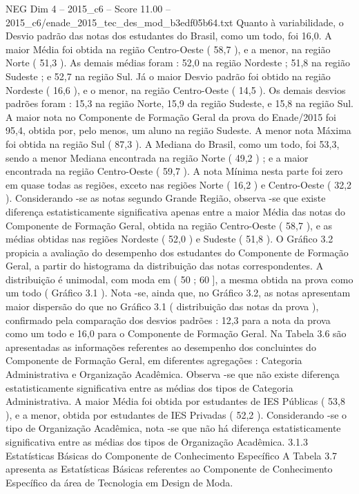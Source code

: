\begin{textsample}{NEG Dim 4 – 2015\_c6 – Score 11.00 – 2015\_c6/enade\_2015\_tec\_des\_mod\_b3edf05b64.txt}
Quanto à variabilidade, o Desvio padrão das notas dos estudantes do Brasil, como um todo, foi 16,0.
A maior Média foi obtida na região Centro-Oeste ( 58,7 ), e a menor, na região Norte ( 51,3 ).
As demais médias foram : 52,0 na região Nordeste ; 51,8 na região Sudeste ; e 52,7 na região Sul.
Já o maior Desvio padrão foi obtido na região Nordeste ( 16,6 ), e o menor, na região Centro-Oeste ( 14,5 ).
Os demais desvios padrões foram : 15,3 na região Norte, 15,9 da região Sudeste, e 15,8 na região Sul.
A maior nota no Componente de Formação Geral da prova do Enade/2015 foi 95,4, obtida por, pelo menos, um aluno na região Sudeste.
A menor nota Máxima foi obtida na região Sul ( 87,3 ).
A Mediana do Brasil, como um todo, foi 53,3, sendo a menor Mediana encontrada na região Norte ( 49,2 ) ; e a maior encontrada na região Centro-Oeste ( 59,7 ).
A nota Mínima nesta parte foi zero em quase todas as regiões, exceto nas regiões Norte ( 16,2 ) e Centro-Oeste ( 32,2 ).
Considerando -se as notas segundo Grande Região, observa -se que existe diferença estatisticamente significativa apenas entre a maior Média das notas do Componente de Formação Geral, obtida na região Centro-Oeste ( 58,7 ), e as médias obtidas nas regiões Nordeste ( 52,0 ) e Sudeste ( 51,8 ).
O Gráfico 3.2 propicia a avaliação do desempenho dos estudantes do Componente de Formação Geral, a partir do histograma da distribuição das notas correspondentes.
A distribuição é unimodal, com moda em ( 50 ; 60 ], a mesma obtida na prova como um todo ( Gráfico 3.1 ).
Nota -se, ainda que, no Gráfico 3.2, as notas apresentam maior dispersão do que no Gráfico 3.1 ( distribuição das notas da prova ), confirmado pela comparação dos desvios padrões : 12,3 para a nota da prova como um todo e 16,0 para o Componente de Formação Geral.
Na Tabela 3.6 são apresentadas as informações referentes ao desempenho dos concluintes do Componente de Formação Geral, em diferentes agregações : Categoria Administrativa e Organização Acadêmica.
Observa -se que não existe diferença estatisticamente significativa entre as médias dos tipos de Categoria Administrativa.
A maior Média foi obtida por estudantes de IES Públicas ( 53,8 ), e a menor, obtida por estudantes de IES Privadas ( 52,2 ).
Considerando -se o tipo de Organização Acadêmica, nota -se que não há diferença estatisticamente significativa entre as médias dos tipos de Organização Acadêmica. 3.1.3 Estatísticas Básicas do Componente de Conhecimento Específico A Tabela 3.7 apresenta as Estatísticas Básicas referentes ao Componente de Conhecimento Específico da área de Tecnologia em Design de Moda.

\end{textsample}
